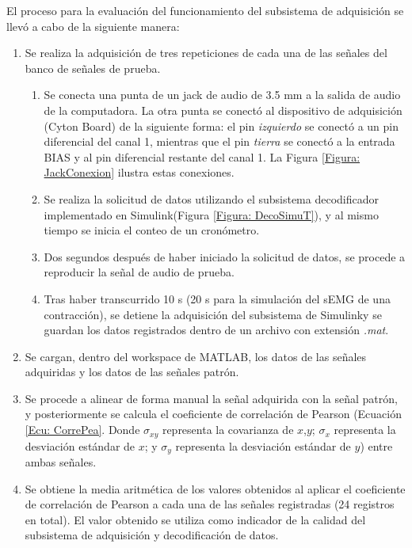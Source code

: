\newpage
El proceso para la evaluación del funcionamiento del subsistema de adquisición se llevó a cabo de la siguiente manera:
\begin{enumerate}
	\item Se realiza la adquisición de tres repeticiones de cada una de las señales del banco de señales de prueba.
	\begin{enumerate}
		\item Se conecta una punta de un jack de audio de 3.5 mm a la salida de audio de la computadora. La otra punta se conectó al dispositivo de adquisición (Cyton Board) de la siguiente forma: el pin \emph{izquierdo} se conectó a un pin diferencial del canal 1, mientras que el pin \emph{tierra} se conectó a la entrada BIAS y al pin diferencial restante del canal 1. La Figura \ref{Figura: JackConexion} ilustra estas conexiones.
		\item Se realiza la solicitud de datos utilizando el subsistema decodificador implementado en Simulink\textregistered (Figura \ref{Figura: DecoSimuT}), y al mismo tiempo se inicia el conteo de un cronómetro.
		\item Dos segundos después de haber iniciado la solicitud de datos, se procede a reproducir la señal de audio de prueba.
		\item Tras haber transcurrido 10 s (20 s para la simulación del sEMG de una contracción), se detiene la adquisición del subsistema de Simulink\textregistered y se guardan los datos registrados dentro de un archivo con extensión \emph{.mat}.
	\end{enumerate}
	\item Se cargan, dentro del workspace de MATLAB\textregistered, los datos de las señales adquiridas y los datos de las señales patrón.
	\item Se procede a alinear de forma manual la señal adquirida con la señal patrón, y posteriormente se calcula el coeficiente de correlación de Pearson (Ecuación \ref{Ecu: CorrePea}. Donde $\sigma_{xy}$ representa la covarianza de $x$,$y$; $\sigma_{x}$ representa la desviación estándar de $x$; y $\sigma_{y}$ representa la desviación estándar de $y$) entre ambas señales.
	\item Se obtiene la media aritmética de los valores obtenidos al aplicar el coeficiente de correlación de Pearson a cada una de las señales registradas (24 registros en total). El valor obtenido se utiliza como indicador de la calidad del subsistema de adquisición y decodificación de datos.
\end{enumerate}

